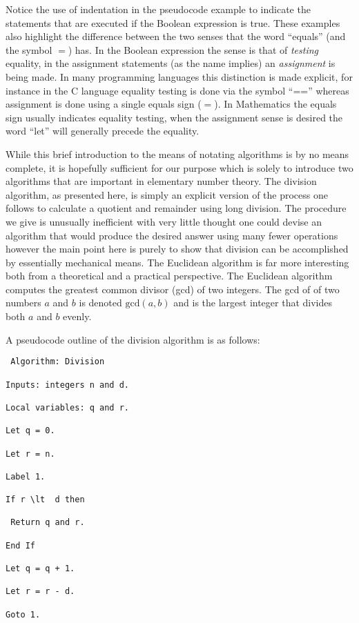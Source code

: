 \documentclass[10pt,]{book}
\theoremstyle{plain}
\theoremstyle{definition}
\theoremstyle{definition}
\numberwithin{equation}{section}
\newenvironment{listing}{}{}
\renewcommand{\gcd}[2]{\mbox{gcd} (#1, #2)}
\newcommand{\lt}{ < }
\begin{document}
    Notice the use of indentation in the pseudocode example to indicate
    the statements that are executed if the Boolean expression is true.
    These examples also highlight the difference between the two senses
    that the word ``equals'' (and the symbol \(=\)) has. In the Boolean
    expression the sense is that of \emph{testing} equality, in the
    assignment statements (as the name implies) an \emph{assignment} is
    being made. In many programming languages this distinction is made
    explicit, for instance in the C language equality testing is done via
    the symbol ``=='' whereas assignment is done using a single equals
    sign (\(=\)). In Mathematics the equals sign usually indicates equality
    testing, when the assignment sense is desired the word ``let'' will
    generally precede the equality.
\par

    While this brief introduction to the means of notating algorithms is by no
    means complete, it is hopefully sufficient for our purpose which is
    solely to introduce two algorithms that are important in elementary
    number theory. The  division algorithm,
    as presented here, is simply
    an explicit version of the process one follows to calculate a quotient
    and remainder using long division. The procedure we give is unusually
    inefficient \textemdash{} with very little thought one could devise an algorithm
    that would produce the desired answer using many fewer operations \textemdash{} however the main point here is purely to show that division can be
    accomplished by essentially mechanical means. The Euclidean algorithm
    is far more interesting both from a theoretical and a practical
    perspective. The Euclidean algorithm computes the greatest common
    divisor (gcd) of two integers. The gcd of of two numbers \(a\) and \(b\)
    is denoted \(\gcd{a}{b}\) and is the largest integer that divides both
    \(a\) and \(b\) evenly.
\par

    A pseudocode outline of the division algorithm is as follows:
\leavevmode%
\begin{listing}
\begin{verbatim}
 Algorithm: Division

Inputs: integers n and d.

Local variables: q and r.

Let q = 0. 

Let r = n. 

Label 1.

If r \lt  d then

 Return q and r.

End If

Let q = q + 1.

Let r = r - d.

Goto 1.
\end{verbatim}
\par
{}\label{listing-1}
\end{listing}
\par
\end{document}
